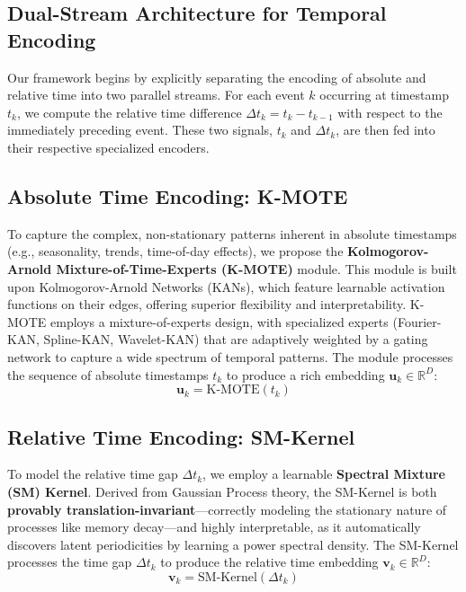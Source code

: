 \documentclass{article}
\begin{document}
\subsection{Dual-Stream Architecture for Temporal Encoding}
Our framework begins by explicitly separating the encoding of absolute and relative time into two parallel streams. For each event $k$ occurring at timestamp $t_k$, we compute the relative time difference $\Delta t_k = t_k - t_{k-1}$ with respect to the immediately preceding event. These two signals, $t_k$ and $\Delta t_k$, are then fed into their respective specialized encoders.

\subsection{Absolute Time Encoding: K-MOTE}
To capture the complex, non-stationary patterns inherent in absolute timestamps (e.g., seasonality, trends, time-of-day effects), we propose the \textbf{Kolmogorov-Arnold Mixture-of-Time-Experts (K-MOTE)} module. This module is built upon Kolmogorov-Arnold Networks (KANs), which feature learnable activation functions on their edges, offering superior flexibility and interpretability. K-MOTE employs a mixture-of-experts design, with specialized experts (Fourier-KAN, Spline-KAN, Wavelet-KAN) that are adaptively weighted by a gating network to capture a wide spectrum of temporal patterns. The module processes the sequence of absolute timestamps $t_k$ to produce a rich embedding $\mathbf{u}_k \in \mathbb{R}^D$:
\begin{equation}
    \mathbf{u}_k = \text{K-MOTE}(t_k)
\end{equation}

\subsection{Relative Time Encoding: SM-Kernel}
To model the relative time gap $\Delta t_k$, we employ a learnable \textbf{Spectral Mixture (SM) Kernel}. Derived from Gaussian Process theory, the SM-Kernel is both \textbf{provably translation-invariant}—correctly modeling the stationary nature of processes like memory decay—and highly interpretable, as it automatically discovers latent periodicities by learning a power spectral density. The SM-Kernel processes the time gap $\Delta t_k$ to produce the relative time embedding $\mathbf{v}_k \in \mathbb{R}^D$:
\begin{equation}
    \mathbf{v}_k = \text{SM-Kernel}(\Delta t_k)
\end{equation}
\end{document}
